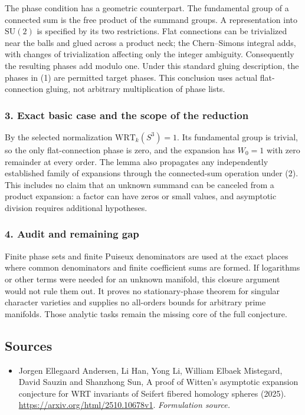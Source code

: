 \documentclass[11pt]{article}
\begin{document}
The phase condition has a geometric counterpart. The fundamental group of a connected sum is the free product of the summand groups. A representation into $\mathrm{SU}(2)$ is specified by its two restrictions. Flat connections can be trivialized near the balls and glued across a product neck; the Chern--Simons integral adds, with changes of trivialization affecting only the integer ambiguity. Consequently the resulting phases add modulo one. Under this standard gluing description, the phases in (1) are permitted target phases. This conclusion uses actual flat-connection gluing, not arbitrary multiplication of phase lists.

\subsubsection{3. Exact basic case and the scope of the reduction}
By the selected normalization $\mathrm{WRT}_k(S^3)=1$. Its fundamental group is trivial, so the only flat-connection phase is zero, and the expansion has $W_0=1$ with zero remainder at every order. The lemma also propagates any independently established family of expansions through the connected-sum operation under (2). This includes no claim that an unknown summand can be canceled from a product expansion: a factor can have zeros or small values, and asymptotic division requires additional hypotheses.

\subsubsection{4. Audit and remaining gap}
Finite phase sets and finite Puiseux denominators are used at the exact places where common denominators and finite coefficient sums are formed. If logarithms or other terms were needed for an unknown manifold, this closure argument would not rule them out. It proves no stationary-phase theorem for singular character varieties and supplies no all-orders bounds for arbitrary prime manifolds. Those analytic tasks remain the missing core of the full conjecture.

\subsection{Sources}
\begin{itemize}
\item[S1]Jorgen Ellegaard Andersen, Li Han, Yong Li, William Elbaek Mistegard, David Sauzin and Shanzhong Sun, A proof of Witten's asymptotic expansion conjecture for WRT invariants of Seifert fibered homology spheres (2025).
\url{https://arxiv.org/html/2510.10678v1}.
\textit{Formulation source.}
\end{itemize}
\end{document}
